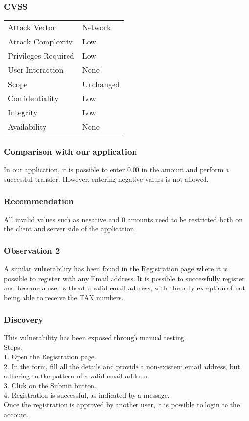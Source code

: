 \subsubsection{CVSS}
\begin{tabular}{l | l}
Attack Vector		& Network \\
Attack Complexity	& Low \\
Privileges Required & Low \\
User Interaction	& None \\
Scope				& Unchanged \\
Confidentiality		& Low \\
Integrity			& Low \\
Availability		& None
\end{tabular}

\subsubsection{Comparison with our application}
In our application, it is possible to enter 0.00 in the amount and perform a successful transfer. However, entering negative values is not allowed.

\subsubsection{Recommendation}
All invalid values such as negative and 0 amounts need to be restricted both on the client and server side of the application.

\subsubsection{Observation 2}
A similar vulnerability has been found in the Registration page where it is possible to register with any Email address. It is possible to successfully register and become a user without a valid email address, with the only exception of not being able to receive the TAN numbers.

\subsubsection{Discovery}
This vulnerability has been exposed through manual testing.\\
Steps: \\
1. Open the Registration page. \\
2. In the form, fill all the details and provide a non-existent email address, but adhering to the pattern of a valid email address. \\
3. Click on the Submit button. \\
4. Registration is successful, as indicated by a message. \\
Once the registration is approved by another user, it is possible to login to the account.

